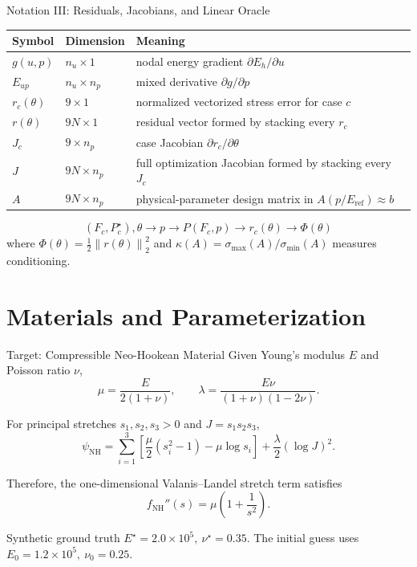 \documentclass[aspectratio=169,10pt]{beamer}
\newcommand{\norm}[1]{\left\lVert #1\right\rVert}
\newcommand{\eref}{E_{\mathrm{ref}}}
\begin{document}
\begin{frame}{Notation III: Residuals, Jacobians, and Linear Oracle}
  \small
  \begin{table}
    \centering
    \begin{tabular}{lll}
      \toprule
      Symbol & Dimension & Meaning \\
      \midrule
      $g(u,p)$ & $n_u\times1$ &
      nodal energy gradient $\partial E_h/\partial u$ \\
      $E_{up}$ & $n_u\times n_p$ &
      mixed derivative $\partial g/\partial p$ \\
      $r_c(\theta)$ & $9\times1$ &
      normalized vectorized stress error for case $c$ \\
      $r(\theta)$ & $9N\times1$ &
      residual vector formed by stacking every $r_c$ \\
      $J_c$ & $9\times n_p$ &
      case Jacobian $\partial r_c/\partial\theta$ \\
      $J$ & $9N\times n_p$ &
      full optimization Jacobian formed by stacking every $J_c$ \\
      $A$ & $9N\times n_p$ &
      physical-parameter design matrix in $A(p/\eref)\approx b$ \\
      \bottomrule
    \end{tabular}
  \end{table}

  \[
    \boxed{
      (F_c,P_c^\star),\theta
      \longrightarrow p
      \longrightarrow P(F_c,p)
      \longrightarrow r_c(\theta)
      \longrightarrow \Phi(\theta)
    }
  \]
  where $\Phi(\theta)=\tfrac12\norm{r(\theta)}_2^2$ and
  $\kappa(A)=\sigma_{\max}(A)/\sigma_{\min}(A)$ measures conditioning.
\end{frame}

\section{Materials and Parameterization}

\begin{frame}{Target: Compressible Neo-Hookean Material}
  \small
  Given Young's modulus $E$ and Poisson ratio $\nu$,
  \[
    \mu=\frac{E}{2(1+\nu)},
    \qquad
    \lambda=\frac{E\nu}{(1+\nu)(1-2\nu)}.
  \]

  For principal stretches $s_1,s_2,s_3>0$ and
  $J=s_1s_2s_3$,
  \[
    \psi_{\mathrm{NH}}
    =
    \sum_{i=1}^{3}
    \left[
      \frac{\mu}{2}(s_i^2-1)-\mu\log s_i
    \right]
    +
    \frac{\lambda}{2}(\log J)^2.
  \]

  Therefore, the one-dimensional Valanis--Landel stretch term satisfies
  \[
    f_{\mathrm{NH}}''(s)
    =
    \mu\left(1+\frac{1}{s^2}\right).
  \]

  \begin{block}{Synthetic ground truth}
    $E^\star=2.0\times10^5,\ \nu^\star=0.35$.
    The initial guess uses $E_0=1.2\times10^5,\ \nu_0=0.25$.
  \end{block}
\end{frame}
\end{document}
